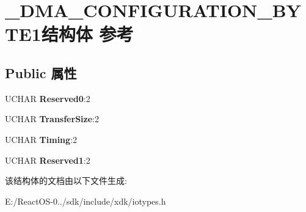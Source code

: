 \hypertarget{struct___d_m_a___c_o_n_f_i_g_u_r_a_t_i_o_n___b_y_t_e1}{}\section{\+\_\+\+D\+M\+A\+\_\+\+C\+O\+N\+F\+I\+G\+U\+R\+A\+T\+I\+O\+N\+\_\+\+B\+Y\+T\+E1结构体 参考}
\label{struct___d_m_a___c_o_n_f_i_g_u_r_a_t_i_o_n___b_y_t_e1}
\subsection*{Public 属性}
\begin{DoxyCompactItemize}
\item 
\mbox{\label{struct___d_m_a___c_o_n_f_i_g_u_r_a_t_i_o_n___b_y_t_e1_a3f7810f69f200bf71c299228022580e0}} 
U\+C\+H\+AR {\bfseries Reserved0}\+:2
\item 
\mbox{\label{struct___d_m_a___c_o_n_f_i_g_u_r_a_t_i_o_n___b_y_t_e1_a84fcf7137f923c997ff4104314880b65}} 
U\+C\+H\+AR {\bfseries Transfer\+Size}\+:2
\item 
\mbox{\label{struct___d_m_a___c_o_n_f_i_g_u_r_a_t_i_o_n___b_y_t_e1_a9c5a5627c755348f0d89a97c120fdafa}} 
U\+C\+H\+AR {\bfseries Timing}\+:2
\item 
\mbox{\label{struct___d_m_a___c_o_n_f_i_g_u_r_a_t_i_o_n___b_y_t_e1_afeb390ef6b7c14299e336a20c9f75cb1}} 
U\+C\+H\+AR {\bfseries Reserved1}\+:2
\end{DoxyCompactItemize}


该结构体的文档由以下文件生成\+:\begin{DoxyCompactItemize}
\item 
E\+:/\+React\+O\+S-\/0../sdk/include/xdk/iotypes.\+h\end{DoxyCompactItemize}
